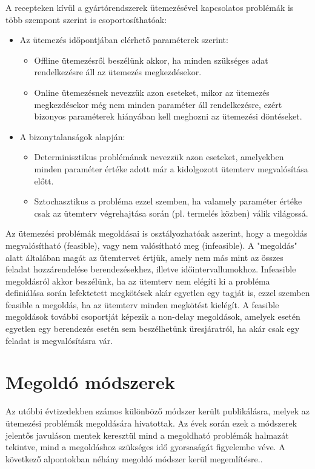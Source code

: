 A recepteken kívül a gyártórendszerek ütemezésével kapcsolatos problémák is több szempont szerint is csoportosíthatóak\cite{phd_Hegyhati}:
\begin{itemize}
\item Az ütemezés időpontjában elérhető paraméterek szerint:
\begin{itemize}
\item Offline ütemezésről beszélünk akkor, ha minden szükséges adat rendelkezésre áll az ütemezés megkezdésekor.
\item Online ütemezésnek nevezzük azon eseteket, mikor az ütemezés megkezdésekor még nem minden paraméter áll rendelkezésre, ezért bizonyos paraméterek hiányában kell meghozni az ütemezési döntéseket.
\end{itemize} 
\item A bizonytalanságok alapján:
\begin{itemize}
\item Determinisztikus problémának nevezzük azon eseteket, amelyekben minden paraméter értéke adott már a kidolgozott ütemterv megvalósítása előtt.
\item Sztochasztikus a probléma ezzel szemben, ha valamely paraméter értéke csak az ütemterv végrehajtása során (pl. termelés közben) válik világossá.
\end{itemize}
\end{itemize}
Az ütemezési problémák megoldásai is osztályozhatóak aszerint, hogy a megoldás megvalósítható (feasible), vagy nem valósítható meg (infeasible).
A "megoldás" alatt általában magát az ütemtervet értjük, amely nem más mint az összes feladat hozzárendelése berendezésekhez, illetve időintervallumokhoz.
Infeasible megoldásról akkor beszélünk, ha az ütemterv nem elégíti ki a probléma definiálása során lefektetett megkötések akár egyetlen egy tagját is, ezzel szemben feasible a megoldás, ha az ütemterv minden megkötést kielégít.
A feasible megoldások további csoportját képezik a non-delay megoldások, amelyek esetén egyetlen egy berendezés esetén sem beszélhetünk üresjáratról, ha akár csak egy feladat is megvalósításra vár.     
\section{Megoldó módszerek}
Az utóbbi évtizedekben számos különböző módszer került publikálásra, melyek az ütemezési problémák megoldására hivatottak.
Az évek során ezek a módszerek jelentős javuláson mentek keresztül mind a megoldható problémák halmazát tekintve, mind a megoldáshoz szükséges idő gyorsaságát figyelembe véve.
A következő alpontokban néhány megoldó módszer kerül megemlítésre..
